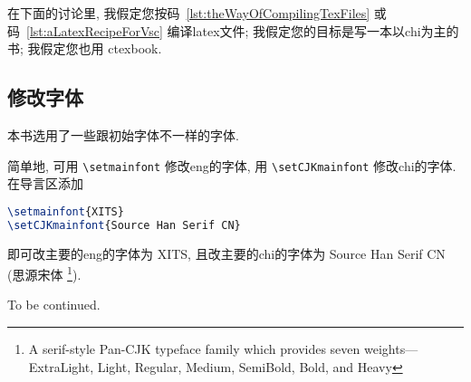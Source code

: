 在下面的讨论里,
我假定您按码~\ref{lst:theWayOfCompilingTexFiles}
或码~\ref{lst:aLatexRecipeForVsc}
编译\gls{latex}文件;
我假定您的目标是写一本以\gls{chi}为主的书;
我假定您也用 \textsf{ctexbook}.

\subsection{修改字体}

本书选用了一些跟初始字体不一样的字体.

简单地, 可用 \verb`\setmainfont` 修改\gls{eng}的字体,
用 \verb`\setCJKmainfont` 修改\gls{chi}的字体.
在导言区添加
\begin{lstlisting}[language=TeX]
\setmainfont{XITS}
\setCJKmainfont{Source Han Serif CN}
\end{lstlisting}
即可改主要的\gls{eng}的字体为 XITS,
且改主要的\gls{chi}的字体为 Source Han Serif CN (思源宋体%
\footnote{A serif-style Pan-CJK typeface family
    which provides seven weights---ExtraLight, Light, Regular,
    Medium, SemiBold, Bold, and Heavy}).

To be continued.
